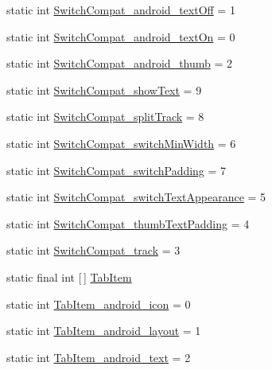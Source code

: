 \begin{DoxyCompactItemize}
\item 
static int \hyperlink{classandroid_1_1support_1_1v4_1_1R_1_1styleable_ab9ffea56b6dc29ec8c9df5f7f58bcdf4}{Switch\+Compat\+\_\+android\+\_\+text\+Off} = 1
\item 
static int \hyperlink{classandroid_1_1support_1_1v4_1_1R_1_1styleable_ab130695aad0fe2adc831a887079ac3cf}{Switch\+Compat\+\_\+android\+\_\+text\+On} = 0
\item 
static int \hyperlink{classandroid_1_1support_1_1v4_1_1R_1_1styleable_a3e61ded8a9be801503c52b0b981e60ef}{Switch\+Compat\+\_\+android\+\_\+thumb} = 2
\item 
static int \hyperlink{classandroid_1_1support_1_1v4_1_1R_1_1styleable_afd7664e77fd28cb758f94f37079b87bf}{Switch\+Compat\+\_\+show\+Text} = 9
\item 
static int \hyperlink{classandroid_1_1support_1_1v4_1_1R_1_1styleable_ac1b201bc3080cd31d6a4579fb95a0af7}{Switch\+Compat\+\_\+split\+Track} = 8
\item 
static int \hyperlink{classandroid_1_1support_1_1v4_1_1R_1_1styleable_a1b72b7cb596d02dd5a8d98490dbe1a50}{Switch\+Compat\+\_\+switch\+Min\+Width} = 6
\item 
static int \hyperlink{classandroid_1_1support_1_1v4_1_1R_1_1styleable_a0e255dd7f9b8259683f42c6b46188916}{Switch\+Compat\+\_\+switch\+Padding} = 7
\item 
static int \hyperlink{classandroid_1_1support_1_1v4_1_1R_1_1styleable_ab4c597f326c0384743a43b0b9438e39c}{Switch\+Compat\+\_\+switch\+Text\+Appearance} = 5
\item 
static int \hyperlink{classandroid_1_1support_1_1v4_1_1R_1_1styleable_adc6c78ef9566075a82031ccba51bd4ea}{Switch\+Compat\+\_\+thumb\+Text\+Padding} = 4
\item 
static int \hyperlink{classandroid_1_1support_1_1v4_1_1R_1_1styleable_a4f27b8668dcf466d20fa43564df8cd81}{Switch\+Compat\+\_\+track} = 3
\item 
static final int \mbox{[}$\,$\mbox{]} \hyperlink{classandroid_1_1support_1_1v4_1_1R_1_1styleable_ad680ed3459bf81f422f0dcae8c50dfc3}{Tab\+Item}
\item 
static int \hyperlink{classandroid_1_1support_1_1v4_1_1R_1_1styleable_a691f8166d05ca47d403a871ffcfc8338}{Tab\+Item\+\_\+android\+\_\+icon} = 0
\item 
static int \hyperlink{classandroid_1_1support_1_1v4_1_1R_1_1styleable_a9f91c8afe073d31917ea616c09636f9b}{Tab\+Item\+\_\+android\+\_\+layout} = 1
\item 
static int \hyperlink{classandroid_1_1support_1_1v4_1_1R_1_1styleable_a4a41f221a6dff9f2540c4311a480ec64}{Tab\+Item\+\_\+android\+\_\+text} = 2

\end{DoxyCompactItemize}
